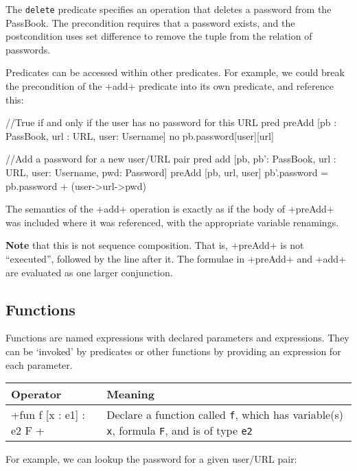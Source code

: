 The \texttt{delete} predicate specifies an operation that deletes a password from the PassBook. The precondition requires that a password exists, and the postcondition uses set difference to remove the tuple from the relation of passwords.

Predicates can be accessed within other predicates. For example, we could break the precondition of the \A+add+ predicate into its own predicate, and reference this:

\begin{alloy}
//True if and only if the user has no password for this URL
pred preAdd [pb : PassBook, url : URL, user: Username] {
    no pb.password[user][url] 
}

//Add a password for a new user/URL pair
pred add [pb, pb': PassBook, url : URL, user: Username, pwd: Password] {
    preAdd [pb, url, user]
    pb'.password = pb.password + (user->url->pwd)
}
\end{alloy}

The semantics of the \A+add+ operation is exactly as if the body of \A+preAdd+ was included where it was referenced, with the appropriate variable renamings. 

\textbf{Note} that this is not sequence composition. That is, \A+preAdd+ is not ``executed'', followed by the line after it. The formulae in \A+preAdd+ and \A+add+ are evaluated as one larger conjunction.

\subsection{Functions}

Functions are named expressions with declared parameters and expressions. They can be `invoked' by predicates or other functions by providing an expression for each parameter.

\begin{center}
\begin{tabular}{lp{9cm}}
\toprule
 Operator & Meaning\\
\midrule
 \A+fun f [x : e1] : e2 { F }+ & Declare a function called \texttt{f}, which has variable(s) \texttt{x}, formula \texttt{F}, and is of type \texttt{e2}\\
\bottomrule
\end{tabular}
\end{center}

For example, we can lookup the password for a given user/URL pair:


